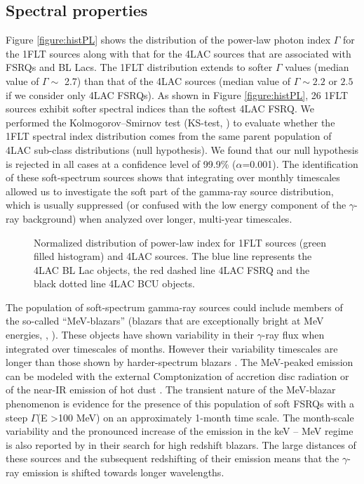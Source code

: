 \documentclass{aastex62}
\begin{document}
\subsection{Spectral properties}

Figure \ref{figure:histPL} shows the distribution of the power-law photon index $\Gamma$ for the 1FLT sources along with that for the 4LAC sources that are associated with FSRQs and BL Lacs.
The 1FLT distribution extends to softer $\Gamma$ values (median value of $\Gamma\sim$ 2.7) than that of the 4LAC sources (median value of $\Gamma\sim 2.2$ or $2.5$ if we consider only 4LAC FSRQs). 
As shown in Figure \ref{figure:histPL}, 26 1FLT sources exhibit softer spectral indices than the softest 4LAC FSRQ. We performed the Kolmogorov–Smirnov test (KS-test, \citealt{kol}) to evaluate whether the 1FLT spectral index distribution comes from the same parent population of 4LAC sub-class distributions (null hypothesis). We found that our null hypothesis is rejected in all cases at a confidence level of 99.9\% ($\alpha$=0.001).
The identification of these soft-spectrum sources shows that integrating over monthly timescales allowed us to investigate the soft part of the gamma-ray source distribution, which is usually suppressed (or confused with the low energy component of the $\gamma$-ray background) when analyzed over longer, multi-year timescales.


\begin{figure}[hbt!]
 \caption{Normalized distribution of power-law index for 1FLT sources (green filled histogram) and 4LAC sources. The blue line represents the 4LAC BL Lac objects, the red dashed line 4LAC FSRQ and the black dotted line 4LAC BCU objects.}
\end{figure}\label{figure:histPL}

The population of soft-spectrum gamma-ray sources could include members of the so-called ``MeV-blazars'' (blazars that are exceptionally bright at MeV energies, \citealt{1995A&A...293L...1B}, \citealt{blom1995}).
These  objects have shown variability in their $\gamma$-ray flux when integrated over timescales of months. However their variability timescales are longer than those shown by harder-spectrum blazars \citep{sikora2002nature}. 
The MeV-peaked emission can be modeled with the external Comptonization of accretion disc radiation or of the near-IR emission of hot dust \citep{bednarek1996}. The transient nature of the MeV-blazar phenomenon is evidence for the presence of this population of soft FSRQs with a steep $\Gamma$(E >100 MeV) on an approximately 1-month time scale.
The month-scale variability and the pronounced increase of the emission in the keV – MeV regime is also reported by \citet{kreter2020search} in their search for high redshift blazars. The large distances of these sources and the subsequent redshifting of their emission means that the $\gamma$-ray emission is shifted towards longer wavelengths. 
\end{document}
